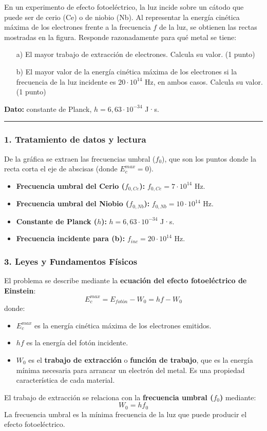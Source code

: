\begin{cajaenunciado}
En un experimento de efecto fotoeléctrico, la luz incide sobre un cátodo que puede ser de cerio (Ce) o de niobio (Nb). Al representar la energía cinética máxima de los electrones frente a la frecuencia $f$ de la luz, se obtienen las rectas mostradas en la figura. Responde razonadamente para qué metal se tiene:
\begin{enumerate}
    \item[a)] El mayor trabajo de extracción de electrones. Calcula su valor. (1 punto)
    \item[b)] El mayor valor de la energía cinética máxima de los electrones si la frecuencia de la luz incidente es $20 \cdot 10^{14}$ Hz, en ambos casos. Calcula su valor. (1 punto)
\end{enumerate}
\textbf{Dato:} constante de Planck, $h = 6,63 \cdot 10^{-34}$ J·s.
\end{cajaenunciado}
\hrule

\subsubsection*{1. Tratamiento de datos y lectura}
De la gráfica se extraen las frecuencias umbral ($f_0$), que son los puntos donde la recta corta el eje de abscisas (donde $E_c^{max}=0$).
\begin{itemize}
    \item \textbf{Frecuencia umbral del Cerio ($f_{0,Ce}$):} $f_{0,Ce} = 7 \cdot 10^{14}$ Hz.
    \item \textbf{Frecuencia umbral del Niobio ($f_{0,Nb}$):} $f_{0,Nb} = 10 \cdot 10^{14}$ Hz.
    \item \textbf{Constante de Planck ($h$):} $h = 6,63 \cdot 10^{-34}$ J·s.
    \item \textbf{Frecuencia incidente para (b):} $f_{inc} = 20 \cdot 10^{14}$ Hz.
\end{itemize}

\subsubsection*{3. Leyes y Fundamentos Físicos}
El problema se describe mediante la \textbf{ecuación del efecto fotoeléctrico de Einstein}:
$$E_c^{max} = E_{fotón} - W_0 = hf - W_0$$
donde:
\begin{itemize}
    \item $E_c^{max}$ es la energía cinética máxima de los electrones emitidos.
    \item $hf$ es la energía del fotón incidente.
    \item $W_0$ es el \textbf{trabajo de extracción} o \textbf{función de trabajo}, que es la energía mínima necesaria para arrancar un electrón del metal. Es una propiedad característica de cada material.
\end{itemize}
El trabajo de extracción se relaciona con la \textbf{frecuencia umbral ($f_0$)} mediante:
$$W_0 = hf_0$$
La frecuencia umbral es la mínima frecuencia de la luz que puede producir el efecto fotoeléctrico.

